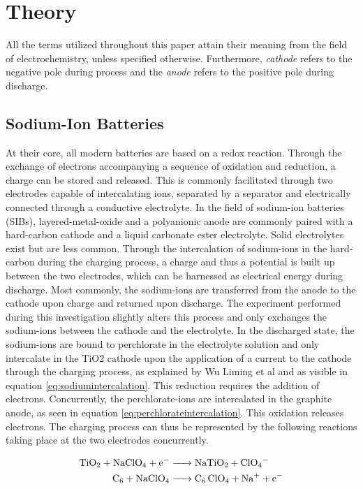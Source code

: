 \section{Theory}
All the terms utilized throughout this paper attain their meaning from the field of electrochemistry, unless specified otherwise. Furthermore, \textit{cathode} refers to the negative pole during process and the \textit{anode} refers to the positive pole during discharge.

\subsection{Sodium-Ion Batteries}
At their core, all modern batteries are based on a redox reaction. Through the exchange of electrons accompanying a sequence of oxidation and reduction, a charge can be stored and released\cite{Beerenwinkel2012}.
This is commonly facilitated through two electrodes capable of intercalating ions, separated by a separator and electrically connected through a conductive electrolyte. In the field of sodium-ion batteries (SIBs), layered-metal-oxide and a polyanionic anode are commonly paired with a hard-carbon cathode and a liquid carbonate ester electrolyte\cite{Xiang2015,Che2017,Xie2020}.
Solid electrolytes exist but are less common\cite{Dai2021}. Through the intercalation of sodium-ions in the hard-carbon during the charging process, a charge and thus a potential is built up between the two electrodes, which can be harnessed as electrical energy during discharge. Most commonly, the sodium-ions are transferred from the anode to the cathode upon charge and returned upon discharge.
The experiment performed during this investigation slightly alters this process and only exchanges the sodium-ions between the cathode and the electrolyte. In the discharged state, the sodium-ions are bound to perchlorate in the electrolyte solution and only intercalate in the TiO2 cathode upon the application of a current to the cathode through the charging process, as explained by Wu Liming et al\cite{Wu2015} and as visible in equation \ref{eq:sodiumintercalation}. This reduction requires the addition of electrons. Concurrently, the perchlorate-ions are intercalated in the graphite anode, as seen in equation \ref{eq:perchlorateintercalation}. This oxidation releases electrons. The charging process can thus be represented by the following reactions taking place at the two electrodes concurrently.

\begin{align}\label{eq:sodiumintercalation}
    \ce{TiO2 + NaClO4 + e- &-> NaTiO2 + ClO4- \\\label{eq:perchlorateintercalation}
    C6 + NaClO4 &-> C6 ClO4 + Na+ +e-}
\end{align}

